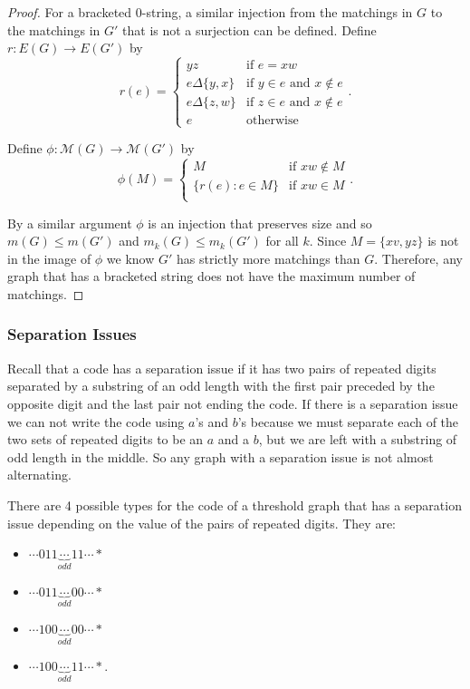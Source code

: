 \documentclass[12pt]{amsart}
\theoremstyle{plain}
\theoremstyle{definition}
\newcommand{\cM}{\mathcal{M}}
\begin{document}
\begin{proof}
For a bracketed $0$-string, a similar injection from the matchings in $G$ to the matchings in $G'$ that is not a surjection can be defined.  
Define $r: E(G)\to E(G')$ by
$$r(e) =
\begin{cases}
yz &\text{if $e = xw$}\\
e\Delta\{y,x\} &\text{if $y\in e$ and $x\notin e$}\\
e\Delta\{z,w\} &\text{if $z\in e$ and $x\notin e$}\\
e  &\text{otherwise}
\end{cases}.$$

Define $\phi: \cM(G) \to \cM(G')$ by
$$\phi(M) = 
\begin{cases}
M &\text{if $xw\notin M$}\\
\{r(e): e\in M\} &\text{if $xw\in M$}\\
\end{cases}.$$

By a similar argument $\phi$ is an injection that preserves size and so $m(G)\leq m(G')$ and $m_k(G) \leq m_k(G')$ for all $k$.  Since  $M=\{xv, yz\}$ is not in the image of $\phi$ we know $G'$ has strictly more matchings than $G$.  Therefore, any graph that has a bracketed string does not have the maximum number of matchings.
\end{proof}

\subsubsection{Separation Issues}

Recall that a code has a separation issue if it has two pairs of repeated digits separated by a substring of an odd length with the first pair preceded by the opposite digit and the last pair not ending the code.  If there is a separation issue we can not write the code using $a$'s and $b$'s because we must separate each of the two sets of repeated digits to be an $a$ and a $b$, but we are left with a substring of odd length in the middle. So any graph with a separation issue is not almost alternating.



There are 4 possible types for the code of a threshold graph that has a separation issue depending on the value of the pairs of repeated digits. They are:
\begin{multicols}{2}
\begin{itemize}
\item $\cdots 011 \underbrace{\cdots}_{odd} 11\cdots *$
\item  $\cdots 011\underbrace{\cdots}_{odd} 00 \cdots *$ 
\end{itemize}
\begin{itemize}
\item $\cdots 100\underbrace{\cdots}_{odd} 00 \cdots *$ 
\item $\cdots 100\underbrace{\cdots}_{odd} 11 \cdots *$.
\end{itemize}
\end{multicols}
\end{document}
